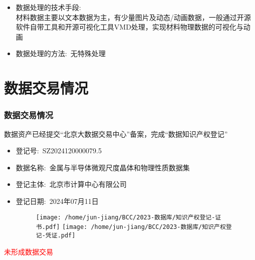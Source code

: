 {\begin{itemize}
\begin{figure}[h!]
\centering
\vskip -5pt
\texttt{[image: /home/jun-jiang/BCC/年度工作/职称/05-专利.png]}
\texttt{[image: /home/jun-jiang/BCC/1-著作权/BCC-MAPDM.jpeg]}
\label{Fig:Patent}
\end{figure}
 \item 数据处理的技术手段:\\
	 材料数据主要以文本数据为主，有少量图片及动态/动画数据，一般通过开源软件自带工具和开源可视化工具\textrm{VMD}处理，实现材料物理数据的可视化与动画
 \item 数据处理的方法:~无特殊处理
\end{itemize}
}

\section{数据交易情况}
\frame
{
	\frametitle{数据交易情况}
	数据资产已经提交``北京大数据交易中心''备案，完成``数据知识产权登记''
	\begin{itemize}
		\item 登记号:~\textrm{SZ2024120000079.5}
		\item 数据名称:~金属与半导体微观尺度晶体和物理性质数据集
		\item 登记主体:~北京市计算中心有限公司
		\item 登记日期:~2024年07月11日
\begin{figure}[h!]
\centering
\vskip -5pt
\texttt{[image: /home/jun-jiang/BCC/2023-数据库/知识产权登记-证书.pdf]}
\texttt{[image: /home/jun-jiang/BCC/2023-数据库/知识产权登记-凭证.pdf]}
\label{Fig:BigData_record}
\end{figure}
	\end{itemize}
	\textcolor{red}{未形成数据交易}
}
%
